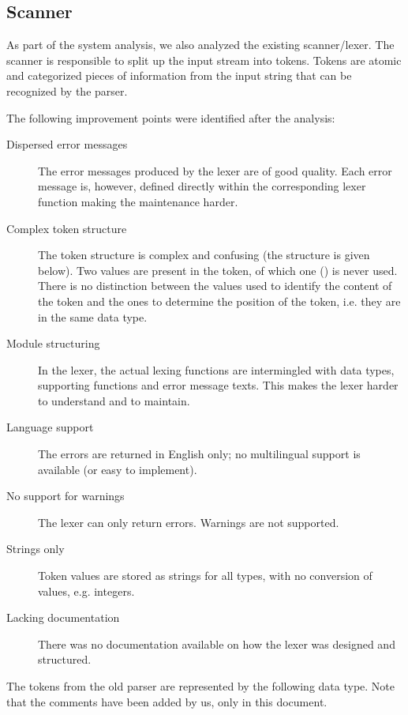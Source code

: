 
\subsection{Scanner}
\label{analysis:lexer}
As part of the system analysis, we also analyzed the existing scanner/lexer.
The scanner is responsible to split up the input stream into tokens.
Tokens are atomic and categorized pieces of information from the input string that can be recognized by the parser.

The following improvement points were identified after the analysis:
\begin{description}
  \item[Dispersed error messages]
    The error messages produced by the lexer are of good quality.
    Each error message is, however, defined directly within the corresponding lexer function making the maintenance harder.
  \item[Complex token structure]
    The token structure is complex and confusing (the structure is given below).
    Two values are present in the token, of which one () is never used.
    There is no distinction between the values used to identify the content of the token and the ones to determine the position of the token, i.e. they are in the same data type.
  \item[Module structuring]
    In the lexer, the actual lexing functions are intermingled with data types, supporting functions and error message texts.
    This makes the lexer harder to understand and to maintain.
  \item[Language support]
    The errors are returned in English only; no multilingual support is available (or easy to implement).
  \item[No support for warnings]
    The lexer can only return errors.
    Warnings are not supported.
  \item[Strings only]
    Token values are stored as strings for all types, with no conversion of values, e.g. integers.
  \item[Lacking documentation]
    There was no documentation available on how the lexer was designed and structured.
\end{description}

The tokens from the old parser are represented by the following data type.
Note that the comments have been added by us, only in this document.

